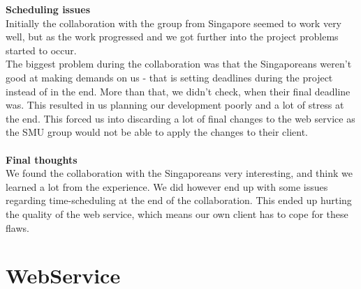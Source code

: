 \documentclass[10pt,a4paper]{article}
\begin{document}
{\bfseries Scheduling issues}\\
Initially the collaboration with the group from Singapore seemed to work very well, but as the work progressed and we got further into the project problems started to occur.\\
The biggest problem during the collaboration was that the Singaporeans weren’t good at making demands on us - that is setting deadlines during the project instead of in the end. More than that, we didn’t check, when their final deadline was. This resulted in us planning our development poorly and a lot of stress at the end. This forced us into discarding a lot of final changes to the web service as the SMU group would not be able to apply the changes to their client. \\\\
{\bfseries Final thoughts}\\
We found the collaboration with the Singaporeans very interesting, and think we learned a lot from the experience. We did however end up with some issues regarding time-scheduling at the end of the collaboration. This ended up hurting the quality of the web service, which means our own client has to cope for these flaws. 






\section{WebService}
\end{document}
